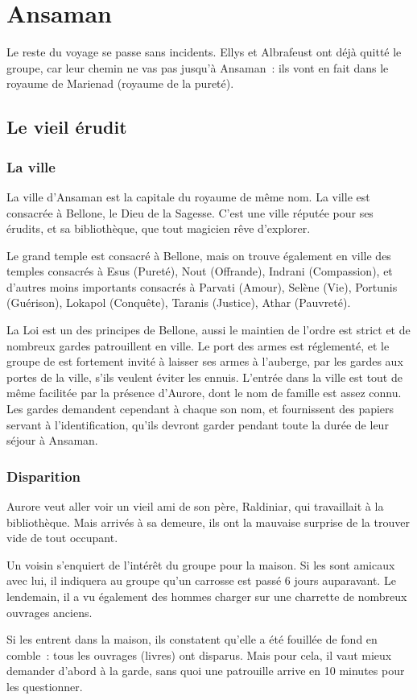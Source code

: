 \documentclass[a4paper,10pt,openany]{book}
\begin{document}
\chapter{Ansaman}
Le reste du voyage se passe sans incidents. Ellys et Albrafeust ont déjà quitté le groupe, car leur chemin ne vas pas jusqu’à Ansaman : ils vont en
fait dans le royaume de Marienad (royaume de la pureté).
\begin{multicols}{2}
\section{Le vieil érudit}
\subsection{La ville}
La ville d’Ansaman est la capitale du royaume de même nom. La ville est consacrée à Bellone, le Dieu de la Sagesse. C’est une ville réputée pour ses
érudits, et sa bibliothèque, que tout magicien rêve d’explorer.\par  Le grand temple est consacré à Bellone, mais on trouve également en ville des
temples consacrés à Esus (Pureté), Nout (Offrande), Indrani (Compassion), et d’autres moins importants consacrés à Parvati (Amour), Selène (Vie),
Portunis (Guérison), Lokapol (Conquête), Taranis (Justice), Athar (Pauvreté).\par La Loi est un des principes de Bellone, aussi le maintien de l’ordre
est strict et de nombreux gardes patrouillent en ville. Le port des armes est réglementé, et le groupe de \PJs est fortement invité à laisser ses
armes à l’auberge, par les gardes aux portes de la ville, s’ils veulent éviter les ennuis. L’entrée dans la ville est tout de même facilitée par la
présence d’Aurore, dont le nom de famille est assez connu. Les gardes demandent cependant à chaque \PJ son nom, et fournissent des papiers servant à
l’identification, qu’ils devront garder pendant toute la durée de leur séjour à Ansaman.

\subsection{Disparition}
Aurore veut aller voir un vieil ami de son père, Raldiniar, qui travaillait à la bibliothèque. Mais arrivés à sa demeure, ils ont la mauvaise surprise
de la trouver vide de tout occupant.\par Un voisin s’enquiert de l’intérêt du groupe pour la maison. Si les \PJs sont amicaux avec lui, il indiquera
au groupe qu’un carrosse est passé 6 jours auparavant. Le lendemain, il a vu également des hommes charger sur une charrette de nombreux ouvrages
anciens.\par Si les \PJs entrent dans la maison, ils constatent qu’elle a été fouillée de fond en comble : tous les ouvrages (livres) ont disparus.
Mais pour cela, il vaut mieux demander d’abord à la garde, sans quoi une patrouille arrive en 10 minutes pour les questionner.


\end{multicols}
\end{document}
